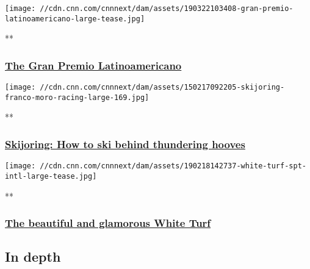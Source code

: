 \texttt{[image: //cdn.cnn.com/cnnnext/dam/assets/190322103408-gran-premio-latinoamericano-large-tease.jpg]}

**

\hypertarget{the-gran-premio-latinoamericano}{%
\subsubsection{\texorpdfstring{\href{/videos/sports/2019/03/22/gran-premio-latinoamericano-explainer-chile-2019-winning-post-vision-spt-intl.cnn}{The
Gran Premio
Latinoamericano}}{The Gran Premio Latinoamericano}}\label{the-gran-premio-latinoamericano}}

\href{/videos/sports/2019/02/27/skijoring-white-turf-st-moritz-horses-skiers-winning-post-vision-spt-intl.cnn}{}

\texttt{[image: //cdn.cnn.com/cnnnext/dam/assets/150217092205-skijoring-franco-moro-racing-large-169.jpg]}

**

\hypertarget{skijoring-how-to-ski-behind-thundering-hooves}{%
\subsubsection{\texorpdfstring{\href{/videos/sports/2019/02/27/skijoring-white-turf-st-moritz-horses-skiers-winning-post-vision-spt-intl.cnn}{Skijoring:
How to ski behind thundering
hooves}}{Skijoring: How to ski behind thundering hooves}}\label{skijoring-how-to-ski-behind-thundering-hooves}}

\href{/videos/sports/2019/02/22/white-turf-overview-st-moritz-skijoring-horses-winning-post-vision-spt-intl.cnn}{}

\texttt{[image: //cdn.cnn.com/cnnnext/dam/assets/190218142737-white-turf-spt-intl-large-tease.jpg]}

**

\hypertarget{the-beautiful-and-glamorous-white-turf}{%
\subsubsection{\texorpdfstring{\href{/videos/sports/2019/02/22/white-turf-overview-st-moritz-skijoring-horses-winning-post-vision-spt-intl.cnn}{The
beautiful and glamorous White
Turf}}{The beautiful and glamorous White Turf}}\label{the-beautiful-and-glamorous-white-turf}}

\hypertarget{in-depth-}{%
\subsection{In depth~}\label{in-depth-}}

